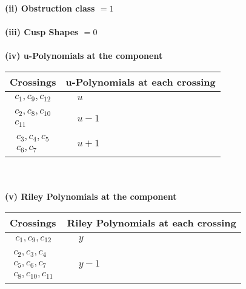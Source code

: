 \documentclass[1p]{elsarticle_modified}
\theoremstyle{definition}
\begin{document}
\flushleft \textbf{(ii) Obstruction class $= 1$}\\~\\
\flushleft \textbf{(iii) Cusp Shapes $= 0$}\\~\\
\newpage\renewcommand{\arraystretch}{1}
\flushleft \textbf{(iv) u-Polynomials at the component}\newline \\
\begin{tabular}{m{50pt}|m{274pt}}
Crossings & \hspace{64pt}u-Polynomials at each crossing \\
\hline $$\begin{aligned}c_{1},c_{9},c_{12}\end{aligned}$$&$\begin{aligned}
&u
\end{aligned}$\\
\hline $$\begin{aligned}c_{2},c_{8},c_{10}\\c_{11}\end{aligned}$$&$\begin{aligned}
&u-1
\end{aligned}$\\
\hline $$\begin{aligned}c_{3},c_{4},c_{5}\\c_{6},c_{7}\end{aligned}$$&$\begin{aligned}
&u+1
\end{aligned}$\\
\hline
\end{tabular}\\~\\
\newpage\renewcommand{\arraystretch}{1}
\flushleft \textbf{(v) Riley Polynomials at the component}\newline \\
\begin{tabular}{m{50pt}|m{274pt}}
Crossings & \hspace{64pt}Riley Polynomials at each crossing \\
\hline $$\begin{aligned}c_{1},c_{9},c_{12}\end{aligned}$$&$\begin{aligned}
&y
\end{aligned}$\\
\hline $$\begin{aligned}c_{2},c_{3},c_{4}\\c_{5},c_{6},c_{7}\\c_{8},c_{10},c_{11}\end{aligned}$$&$\begin{aligned}
&y-1
\end{aligned}$\\
\hline
\end{tabular}\\~\\
\end{document}
